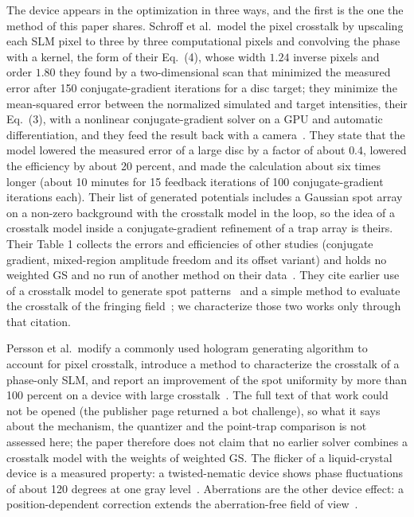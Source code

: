 The device appears in the optimization in three ways, and the first is the one the method of this paper shares. Schroff et al.\ model the pixel crosstalk by upscaling each SLM pixel to three by three computational pixels and convolving the phase with a kernel, the form of their Eq.~(4), whose width $1.24$ inverse pixels and order $1.80$ they found by a two-dimensional scan that minimized the measured error after 150 conjugate-gradient iterations for a disc target; they minimize the mean-squared error between the normalized simulated and target intensities, their Eq.~(3), with a nonlinear conjugate-gradient solver on a GPU and automatic differentiation, and they feed the result back with a camera~\cite{schroff}. They state that the model lowered the measured error of a large disc by a factor of about $0.4$, lowered the efficiency by about 20 percent, and made the calculation about six times longer (about 10 minutes for 15 feedback iterations of 100 conjugate-gradient iterations each). Their list of generated potentials includes a Gaussian spot array on a non-zero background with the crosstalk model in the loop, so the idea of a crosstalk model inside a conjugate-gradient refinement of a trap array is theirs. Their Table 1 collects the errors and efficiencies of other studies (conjugate gradient, mixed-region amplitude freedom and its offset variant) and holds no weighted GS and no run of another method on their data~\cite{schroff}. They cite earlier use of a crosstalk model to generate spot patterns~\cite{ronzitti} and a simple method to evaluate the crosstalk of the fringing field~\cite{moreno}; we characterize those two works only through that citation.

Persson et al.\ modify a commonly used hologram generating algorithm to account for pixel crosstalk, introduce a method to characterize the crosstalk of a phase-only SLM, and report an improvement of the spot uniformity by more than 100 percent on a device with large crosstalk~\cite{persson}. The full text of that work could not be opened (the publisher page returned a bot challenge), so what it says about the mechanism, the quantizer and the point-trap comparison is not assessed here; the paper therefore does not claim that no earlier solver combines a crosstalk model with the weights of weighted GS. The flicker of a liquid-crystal device is a measured property: a twisted-nematic device shows phase fluctuations of about 120 degrees at one gray level~\cite{lizana}. Aberrations are the other device
effect: a position-dependent correction extends the aberration-free field of view~\cite{machu,christen}.

